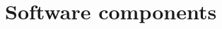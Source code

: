 \section{Software components}

\begin{comment}
	What are the major software components of the program, what is(are) their role(s)
		- Image representation in memory
			- Old way : DiscreteGrid
			- New way : Grid<ImageBackendImpl>
		- Visualization primitives
			- Viewers : 3D and 2D
			- Scene
			- The different components of the scene, more detailed
		- Generation primitives
		- Tasks / multi-threaded stuff
		- General purpose / other things that didn't fit into above
\end{comment}
